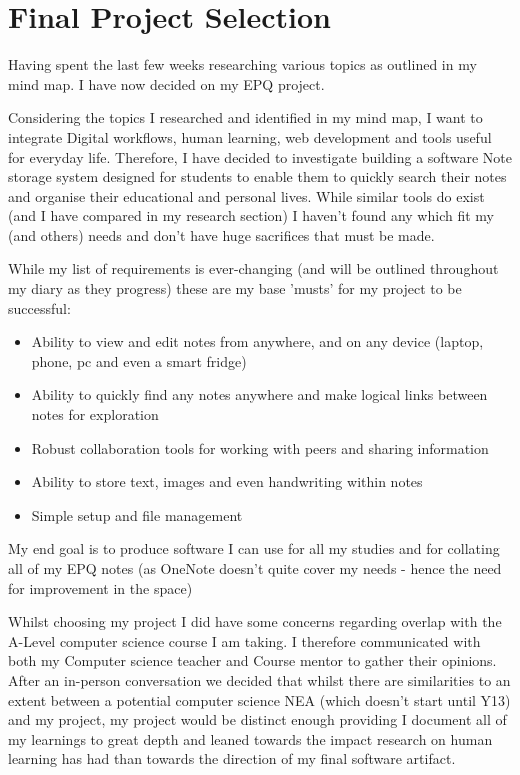 \section{Final Project Selection}
Having spent the last few weeks researching various topics as outlined in my mind map. I have now decided on my EPQ project.

Considering the topics I researched and identified in my mind map, I want to integrate Digital workflows, human learning, web development and tools useful for everyday life. Therefore, I have decided to investigate building a software Note storage system designed for students to enable them to quickly search their notes and organise their educational and personal lives. While similar tools do exist (and I have compared in my research section) I haven't found any which fit my (and others) needs and don't have huge sacrifices that must be made.

While my list of requirements is ever-changing (and will be outlined throughout my diary as they progress) these are my base 'musts' for my project to be successful:
\begin{itemize}
	\item Ability to view and edit notes from anywhere, and on any device (laptop, phone, pc and even a smart fridge)
	\item Ability to quickly find any notes anywhere and make logical links between notes for exploration
	\item Robust collaboration tools for working with peers and sharing information
	\item Ability to store text, images and even handwriting within notes
	\item Simple setup and file management  
\end{itemize}
My end goal is to produce software I can use for all my studies and for collating all of my EPQ notes (as OneNote doesn't quite cover my needs - hence the need for improvement in the space) 

Whilst choosing my project I did have some concerns regarding overlap with the A-Level computer science course I am taking. I therefore communicated with both my Computer science teacher and Course mentor to gather their opinions. After an in-person conversation we decided that whilst there are similarities to an extent between a potential computer science NEA (which doesn't start until Y13) and my project, my project would be distinct enough providing I document all of my learnings to great depth and leaned towards the impact research on human learning has had than  towards the direction of my final software artifact.

